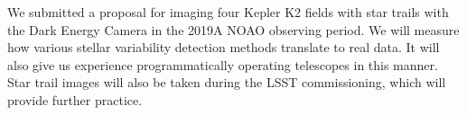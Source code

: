 \documentclass[12pt, letterpaper]{article}
\begin{document}

We submitted a proposal for imaging four Kepler K2 fields with star trails with the Dark Energy Camera in the 2019A NOAO observing period. We will measure how various stellar variability detection methods translate to real data. It will also give us experience programmatically operating telescopes in this manner. Star trail images will also be taken during the LSST commissioning, which will provide further practice. 



\end{document}
